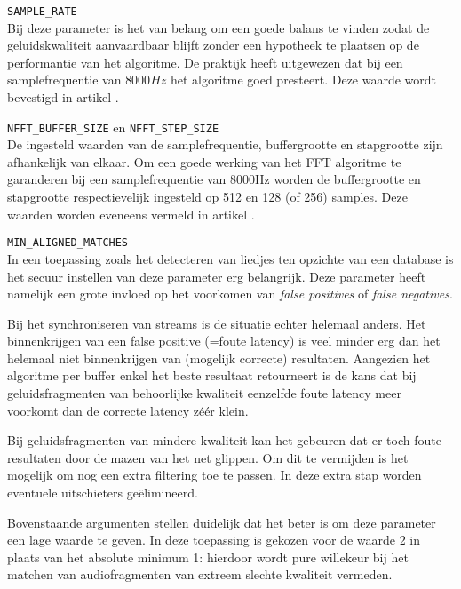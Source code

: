 \begin{description}
	\item\texttt{SAMPLE\_RATE} \hfill \\
	Bij deze parameter is het van belang om een goede balans te vinden zodat de geluidskwaliteit aanvaardbaar blijft zonder een hypotheek te plaatsen op de performantie van het algoritme. De praktijk heeft uitgewezen dat bij een samplefrequentie van $ 8000Hz $ het algoritme goed presteert. Deze waarde wordt bevestigd in artikel \cite{six2015multimodal}.
	\item\texttt{NFFT\_BUFFER\_SIZE} en \texttt{NFFT\_STEP\_SIZE} \hfill \\
	De ingesteld waarden van de samplefrequentie, buffergrootte en stapgrootte zijn afhankelijk van elkaar. Om een goede werking van het FFT algoritme te garanderen bij een samplefrequentie van 8000Hz worden de buffergrootte en stapgrootte respectievelijk ingesteld op 512 en 128 (of 256) samples. Deze waarden worden eveneens vermeld in artikel \cite{six2015multimodal}.
	\item\texttt{MIN\_ALIGNED\_MATCHES} \hfill \\
	In een toepassing zoals het detecteren van liedjes ten opzichte van een database is het secuur instellen van deze parameter erg belangrijk. Deze parameter heeft namelijk een grote invloed op het voorkomen van \textit{false positives} of \textit{false negatives}. 
	
	Bij het synchroniseren van streams is de situatie echter helemaal anders. Het binnenkrijgen van een false positive (=foute latency) is veel minder erg dan het helemaal niet binnenkrijgen van (mogelijk correcte) resultaten. Aangezien het algoritme per buffer enkel het beste resultaat retourneert is de kans dat bij geluidsfragmenten van behoorlijke kwaliteit eenzelfde foute latency meer voorkomt dan de correcte latency zéér klein.
	
	Bij geluidsfragmenten van mindere kwaliteit kan het gebeuren dat er toch foute resultaten door de mazen van het net glippen. Om dit te vermijden is het mogelijk om nog een extra filtering toe te passen. In deze extra stap worden eventuele uitschieters geëlimineerd.
	
	Bovenstaande argumenten stellen duidelijk dat het beter is om deze parameter een lage waarde te geven. In deze toepassing is gekozen voor de waarde 2 in plaats van het absolute minimum 1: hierdoor wordt pure willekeur bij het matchen van audiofragmenten van extreem slechte kwaliteit vermeden.
	

\end{description}
